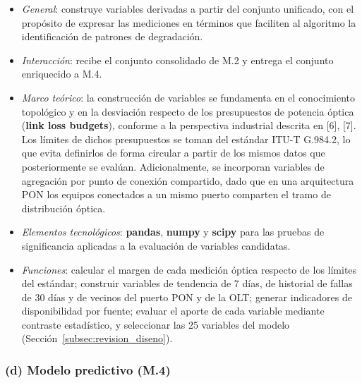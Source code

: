 \documentclass[12pt,a4paper]{article}
\begin{document}
\begin{itemize}
    \item \textit{General}: construye variables derivadas a partir del conjunto unificado, con el propósito de expresar las mediciones en términos que faciliten al algoritmo la identificación de patrones de degradación.
    \item \textit{Interacción}: recibe el conjunto consolidado de M.2 y entrega el conjunto enriquecido a M.4.
    \item \textit{Marco teórico}: la construcción de variables se fundamenta en el conocimiento topológico y en la desviación respecto de los presupuestos de potencia óptica (\textbf{link loss budgets}), conforme a la perspectiva industrial descrita en [6], [7]. Los límites de dichos presupuestos se toman del estándar ITU-T G.984.2, lo que evita definirlos de forma circular a partir de los mismos datos que posteriormente se evalúan. Adicionalmente, se incorporan variables de agregación por punto de conexión compartido, dado que en una arquitectura PON los equipos conectados a un mismo puerto comparten el tramo de distribución óptica.
    \item \textit{Elementos tecnológicos}: \textbf{pandas}, \textbf{numpy} y \textbf{scipy} para las pruebas de significancia aplicadas a la evaluación de variables candidatas.
    \item \textit{Funciones}: calcular el margen de cada medición óptica respecto de los límites del estándar; construir variables de tendencia de 7 días, de historial de fallas de 30 días y de vecinos del puerto PON y de la OLT; generar indicadores de disponibilidad por fuente; evaluar el aporte de cada variable mediante contraste estadístico, y seleccionar las 25 variables del modelo (Sección~\ref{subsec:revision_diseno}).
\end{itemize}

\subsubsection*{(d) Modelo predictivo (M.4)}
 
\end{document}
